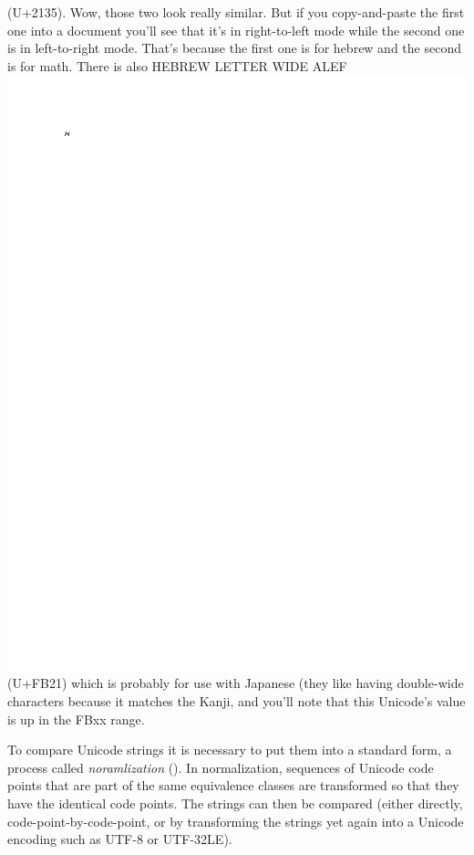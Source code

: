 \begin{description}
(U+2135). Wow, those two look really similar. But if you
copy-and-paste the first one into a document you'll see that it's in
right-to-left mode while the second one is in left-to-right
mode. That's because the first one is for hebrew and the second is for
math. There is also HEBREW LETTER WIDE ALEF \includegraphics{uni/unicode_FB21} (U+FB21) which is
probably for use with Japanese (they like having double-wide
characters because it matches the Kanji, and you'll note that this
Unicode's value is up in the FBxx range.


\end{description}

To compare Unicode strings it is necessary to put them into a standard
form, a process called \emph{noramlization} (). In normalization,
sequences of Unicode code points that are part of the same equivalence classes are transformed
so that they have the identical code points. The strings can then be
compared (either directly, code-point-by-code-point, or by
transforming the strings yet again into a Unicode encoding such as
UTF-8 or UTF-32LE). 

